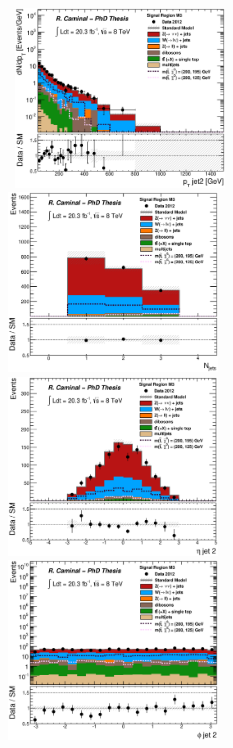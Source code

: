 \begin{figure}[!ht]
  \begin{center}
    \mbox{
      \includegraphics[width=0.495\textwidth]{MonojetAnalysis/Figures/plot_Stop_A4_SR_pt2_fitted.eps}
      \includegraphics[width=0.495\textwidth]{MonojetAnalysis/Figures/plot_Stop_A4_SR_n_jets_fitted.eps}
    }
    \mbox{
      \includegraphics[width=0.495\textwidth]{MonojetAnalysis/Figures/plot_Stop_A4_SR_eta2_fitted.eps}
      \includegraphics[width=0.495\textwidth]{MonojetAnalysis/Figures/plot_Stop_A4_SR_phi2_fitted.eps}
}
\end{center}
\end{figure}
